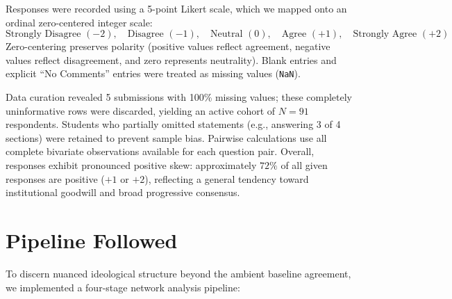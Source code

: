 \documentclass[11pt,a4paper]{article}
\begin{document}
Responses were recorded using a 5-point Likert scale, which we mapped onto an ordinal zero-centered integer scale:
\[
\text{Strongly Disagree } (-2), \quad \text{Disagree } (-1), \quad \text{Neutral } (0), \quad \text{Agree } (+1), \quad \text{Strongly Agree } (+2)
\]
Zero-centering preserves polarity (positive values reflect agreement, negative values reflect disagreement, and zero represents neutrality). Blank entries and explicit ``No Comments'' entries were treated as missing values (\texttt{NaN}). 

Data curation revealed 5 submissions with 100\% missing values; these completely uninformative rows were discarded, yielding an active cohort of $N = 91$ respondents. Students who partially omitted statements (e.g., answering 3 of 4 sections) were retained to prevent sample bias. Pairwise calculations use all complete bivariate observations available for each question pair. Overall, responses exhibit pronounced positive skew: approximately $72\%$ of all given responses are positive ($+1$ or $+2$), reflecting a general tendency toward institutional goodwill and broad progressive consensus.

\section{Pipeline Followed}
To discern nuanced ideological structure beyond the ambient baseline agreement, we implemented a four-stage network analysis pipeline:
\end{document}

